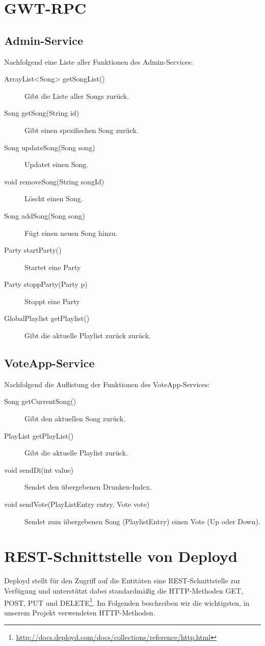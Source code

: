 \section{GWT-RPC}

\subsection{Admin-Service}
Nachfolgend eine Liste aller Funktionen des Admin-Services:
\begin{description}
	\item[ArrayList<Song> getSongList()] Gibt die Liste aller Songs zurück.
	\item[Song getSong(String id)] Gibt einen spezifischen Song zurück.
	\item[Song updateSong(Song song)] Updatet einen Song.
	\item[void removeSong(String songId)]	Löscht einen Song.
	\item[Song addSong(Song song)] Fügt einen neuen Song hinzu.
	\item[Party startParty()]	Startet eine Party
	\item[Party stoppParty(Party p)] Stoppt eine Party
	\item[GlobalPlaylist getPlaylist()] Gibt die aktuelle Playlist zurück zurück.
\end{description}


\subsection{VoteApp-Service}
Nachfolgend die Auflistung der Funktionen des VoteApp-Services:
\begin{description}
	\item[Song getCurrentSong()] Gibt den aktuellen Song zurück.
	\item[PlayList getPlayList()]	Gibt die aktuelle Playlist zurück.
	\item[void sendDi(int value)] Sendet den übergebenen Drunken-Index.
	\item[void sendVote(PlayListEntry entry, Vote vote)] Sendet zum übergebenen Song (PlaylistEntry) einen Vote (Up oder Down).
\end{description}

\newpage
\section{REST-Schnittstelle von Deployd}
\label{anh:rest}
Deployd stellt für den Zugriff auf die Entitäten eine REST-Schnittstelle zur Verfügung und unterstützt dabei standardmäßig die HTTP-Methoden GET, POST, PUT und DELETE\footnote{\url{http://docs.deployd.com/docs/collections/reference/http.html}}. Im Folgenden beschreiben wir die wichtigsten, in unserem Projekt verwendeten HTTP-Methoden.

